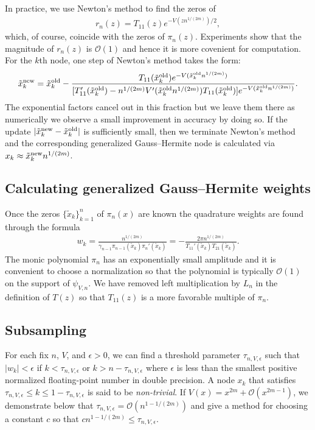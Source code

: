 \documentclass[final]{siamltex}
\begin{document}
In practice, we use Newton's method to find the zeros of
\begin{align*}
r_n(z) = T_{11}(z) e^{-V(z n^{1/(2m)})/2},
\end{align*}
which, of course, coincide with the zeros of $\pi_{n}(z)$.  Experiments show
that the magnitude of $r_n(z)$ is ${\mathcal O}(1)$ and hence it is more covenient for computation. For the $k$th node, one step of 
Newton's method takes the form:
\begin{align*}
\tilde x_k^{\rm new} = \tilde x_k^{\rm old} - \frac{T_{11}(\tilde x_k^{\rm old}) e^{-V(\tilde x_k^{\rm old} n^{1/(2m)})}}{[T_{11}'(\tilde x_k^{\rm old})- n^{1/(2m)} V'(\tilde x_k^{\rm old} n^{1/(2m)}) T_{11}(\tilde x_k^{\rm old})] e^{-V(\tilde x_k^{\rm old} n^{1/(2m)})}}.
\end{align*}
The exponential factors cancel out in this fraction but we leave them there as numerically we observe a 
small improvement in accuracy by doing so. If the update $|\tilde x_k^{\rm new} - \tilde x_k^{\rm old}|$ is sufficiently small, then 
we terminate Newton's method and the corresponding generalized Gauss--Hermite node is calculated via 
$x_k \approx \tilde x_k^{\rm new} n^{1/(2m)}$.

\subsection{Calculating generalized Gauss--Hermite weights}

Once the zeros $\{\tilde x_{k}\}_{k=1}^n$ of $\pi_n(x)$ are known the quadrature weights are found through the formula \cite{Hildebrand}
\begin{align}\label{weight-formula}
w_{k} = \frac{n^{1/(2m)}}{\gamma_{n-1} \pi_{n-1}(\tilde x_{k}) \pi_n'(\tilde x_{k})}    = - \frac{2 \pi n^{1/(2m)}}{T_{11}'(\tilde x_{k}) T_{21}(\tilde x_{k})}.
\end{align}
The monic polynomial $\pi_n$ has an exponentially small amplitude and it is convenient to choose a normalization so that the polynomial is typically ${\mathcal O}(1)$ on the support of $\psi_{V,n}$.  We have removed left multiplication by $L_n$ in the definition of $T(z)$ so that $T_{11}(z)$ is a more favorable multiple of $\pi_n$.

\subsection{Subsampling}

For each fix $n$, $V$, and $\epsilon > 0$, we can find a threshold parameter $\tau_{n,V,\epsilon}$ such that $|w_{k}| < \epsilon$ if $k < \tau_{n,V,\epsilon}$ or $k > n - \tau_{n,V,\epsilon}$ where $\epsilon$ is less than the smallest positive normalized floating-point number in double precision.  A node $x_{k}$ that satisfies $\tau_{n,V,\epsilon} \leq k \leq 1- \tau_{n,V,\epsilon}$ is said to be {\em non-trivial}.  If $V(x) = x^{2m} + {\mathcal O}(x^{2m -1})$, we demonstrate below that $\tau_{n,V,\epsilon} = {\mathcal O}(n^{1  - 1/(2m)})$ and give a method for choosing a constant $c$ so that $c n^{1  - 1/(2m)} \leq \tau_{n,V,\epsilon}$.
\end{document}

